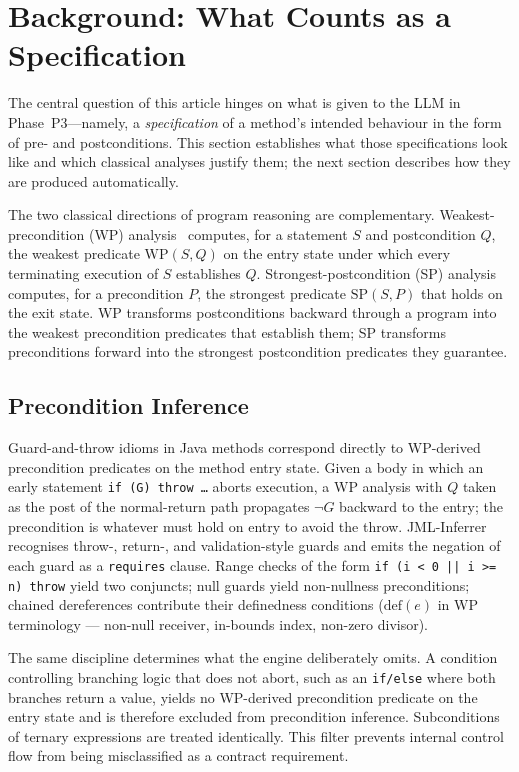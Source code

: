 \section{Background: What Counts as a Specification}
\label{sec:background}

The central question of this article hinges on what is given to the LLM in Phase~P3---namely, a \emph{specification} of a method's intended behaviour in the form of pre- and postconditions. This section establishes what those specifications look like and which classical analyses justify them; the next section describes how they are produced automatically.

The two classical directions of program reasoning are complementary. Weakest-precondition (WP) analysis~\cite{dijkstra_guarded_1975, dijkstra1976discipline} computes, for a statement $S$ and postcondition $Q$, the weakest predicate $\text{WP}(S, Q)$ on the entry state under which every terminating execution of $S$ establishes $Q$. Strongest-postcondition (SP) analysis~\cite{hoare1969axiomatic, cousot1977abstract} computes, for a precondition $P$, the strongest predicate $\text{SP}(S, P)$ that holds on the exit state. WP transforms postconditions backward through a program into the weakest precondition predicates that establish them; SP transforms preconditions forward into the strongest postcondition predicates they guarantee.

\subsection{Precondition Inference}
\label{subsec:wp-mapping}

Guard-and-throw idioms in Java methods correspond directly to WP-derived precondition predicates on the method entry state. Given a body in which an early statement \texttt{if (G) throw \dots} aborts execution, a WP analysis with $Q$ taken as the post of the normal-return path propagates $\neg G$ backward to the entry; the precondition is whatever must hold on entry to avoid the throw. JML-Inferrer recognises throw-, return-, and validation-style guards and emits the negation of each guard as a \texttt{requires} clause. Range checks of the form \texttt{if (i < 0 || i >= n) throw} yield two conjuncts; null guards yield non-nullness preconditions; chained dereferences contribute their definedness conditions ($\text{def}(e)$ in WP terminology --- non-null receiver, in-bounds index, non-zero divisor).

The same discipline determines what the engine deliberately omits. A condition controlling branching logic that does not abort, such as an \texttt{if/else} where both branches return a value, yields no WP-derived precondition predicate on the entry state and is therefore excluded from precondition inference. Subconditions of ternary expressions are treated identically. This filter prevents internal control flow from being misclassified as a contract requirement.

